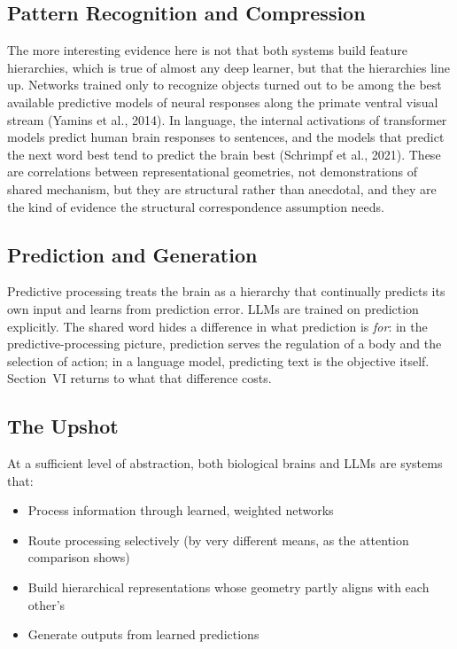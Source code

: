 \documentclass[11pt,letterpaper]{article}
\begin{document}
\subsection{Pattern Recognition and Compression}

The more interesting evidence here is not that both systems build feature hierarchies, which is true of almost any deep learner, but that the hierarchies line up. Networks trained only to recognize objects turned out to be among the best available predictive models of neural responses along the primate ventral visual stream (Yamins et al., 2014). In language, the internal activations of transformer models predict human brain responses to sentences, and the models that predict the next word best tend to predict the brain best (Schrimpf et al., 2021). These are correlations between representational geometries, not demonstrations of shared mechanism, but they are structural rather than anecdotal, and they are the kind of evidence the structural correspondence assumption needs.

\subsection{Prediction and Generation}

Predictive processing treats the brain as a hierarchy that continually predicts its own input and learns from prediction error. LLMs are trained on prediction explicitly. The shared word hides a difference in what prediction is \emph{for}: in the predictive-processing picture, prediction serves the regulation of a body and the selection of action; in a language model, predicting text is the objective itself. Section~VI returns to what that difference costs.

\subsection{The Upshot}

At a sufficient level of abstraction, both biological brains and LLMs are systems that:
\begin{itemize}
  \item Process information through learned, weighted networks
  \item Route processing selectively (by very different means, as the attention comparison shows)
  \item Build hierarchical representations whose geometry partly aligns with each other's
  \item Generate outputs from learned predictions
\end{itemize}
\end{document}

